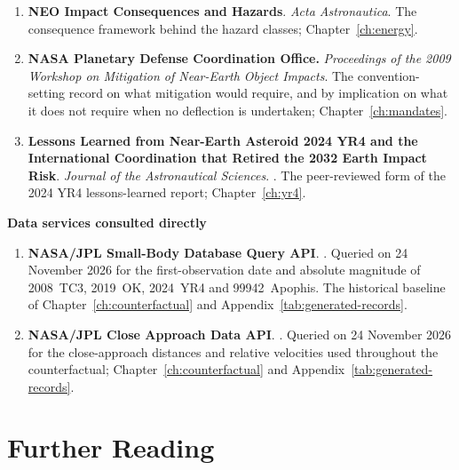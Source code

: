 \begin{enumerate}[leftmargin=2.9em,itemsep=4pt,resume]

\item \textbf{NEO Impact Consequences and Hazards}. \emph{Acta Astronautica}.
The consequence framework behind the hazard classes; Chapter~\ref{ch:energy}.

\item \textbf{NASA Planetary Defense Coordination Office.} \emph{Proceedings of
the 2009 Workshop on Mitigation of Near-Earth Object Impacts}. The
convention-setting record on what mitigation would require, and by
implication on what it does not require when no deflection is undertaken;
Chapter~\ref{ch:mandates}.

\item \textbf{Lessons Learned from Near-Earth Asteroid 2024 YR4 and the
International Coordination that Retired the 2032 Earth Impact Risk}.
\emph{Journal of the Astronautical Sciences}. .
The peer-reviewed form of the 2024 YR4 lessons-learned report;
Chapter~\ref{ch:yr4}.

\end{enumerate}

\vspace{8pt}
{\sffamily\bfseries\small Data services consulted directly}

\begin{enumerate}[leftmargin=2.9em,itemsep=4pt,resume]

\item \textbf{NASA/JPL Small-Body Database Query API}.
. Queried on 24 November 2026 for the
first-observation date and absolute magnitude of 2008~TC3, 2019~OK,
2024~YR4 and 99942~Apophis. The historical baseline of
Chapter~\ref{ch:counterfactual} and Appendix~\ref{tab:generated-records}.

\item \textbf{NASA/JPL Close Approach Data API}.
. Queried on 24 November 2026 for the
close-approach distances and relative velocities used throughout the
counterfactual; Chapter~\ref{ch:counterfactual} and
Appendix~\ref{tab:generated-records}.

\end{enumerate}
\clearpage

\chapter*{Further Reading}
\thispagestyle{plain}


